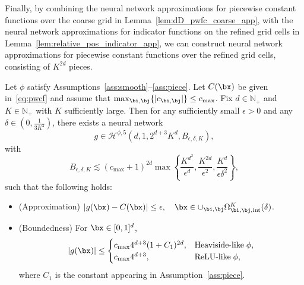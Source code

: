\documentclass[11pt]{article}
\begin{document}
Finally, by combining the neural network approximations for piecewise constant functions over the coarse grid in Lemma~\ref{lem:dD_pwfc_coarse_app}, with the neural network approximations for indicator functions on the refined grid cells in Lemma~\ref{lem:relative_pos_indicator_app}, we can construct neural network approximations for piecewise constant functions over the refined grid cells, consisting of $K^{2d}$ pieces.
\begin{lemma}
    Let  $\phi$ satisfy Assumptions~\ref{ass:smooth}--\ref{ass:piece}. Let $C(\bx)$ be given in~\eqref{eq:pwcf} and assume that $\max_{\bi, \bj} \{|c_{\bi,\bj}|\} \leq c_{\max}$. Fix $d\in\mathbb{N}_{+}$ and $K\in\mathbb{N}_{+}$ with $K$ sufficiently large.
    Then for any sufficiently small $\epsilon>0$ and any $\delta \in (0, \frac{1}{3K^2})$, there exists a neural network 
     \begin{equation*}
        g \in \mathcal{H}^{\phi,5}(d, 1, 2^{d+3} K^d, B_{\epsilon, \delta, K}),
    \end{equation*}
    with
    \begin{equation}
        B_{\epsilon, \delta, K} \lesssim (c_{\max}+ 1)^{2d} \max \left\{ \frac{K^{d^2}}{\epsilon^d}, \frac{K^{2d}}{\epsilon^{2}}, \frac{K^d}{\epsilon \delta^2} \right\},
        \label{eq:norm_pwcf_refined}
    \end{equation}
   such that the following holds:
    \begin{itemize}
        \item (Approximation) $|g(\bx) - C(\bx)| \leq \epsilon, \quad \bx \in \cup_{\bi,\bj} \Omega^K_{\bi, \bj, \mathrm{int}}(\delta)$.
        \item (Boundedness) For $\bx \in [0,1]^d$,
        \begin{equation*}
            |g(\bx)| \le \begin{cases}
                c_{\max}4^{d+3} (1+ C_1)^{2d}, &   \textrm{Heaviside-like} \; \phi ,\\
                c_{\max}4^{d+3}, &  \textrm{ReLU-like} \; \phi,
            \end{cases}   
        \end{equation*}
        where $C_1$ is the constant appearing in Assumption~\ref{ass:piece}.
        \label{lem:pwcf_refined_app}
    \end{itemize}
\end{lemma}
\end{document}
